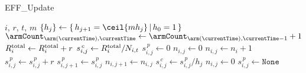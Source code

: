 \begin{algorithm}

\caption{{\small\sc EFF\_Update}}
\begin{algorithmic}[H]
\label{EFFUPDATE}
\REQUIRE $i$, $r$, $t$, $m$
\STATE $\left\{h_j\right\} \leftarrow  \left\{\, h_{j+1} = \ceil{mh_j}\, |\, h_0 =1 \,\right\}$
\STATE $\armCount_{\arm(\currentTime),\currentTime} \leftarrow \armCount_{\arm(\currentTime),\currentTime-1} +1$
\STATE $R^{\rm total}_i \leftarrow R^{\rm total}_i + r$ 
{\footnotesize {}}
\STATE $s_{i,j}^{\,c} \leftarrow R_i^{\rm total}/N_{i,t}$ 
{\footnotesize {}}
\STATE $s_{i,j}^{\,p} \leftarrow 0$
\STATE $n_{i,j}\leftarrow 0$
\ENDIF
{}
\STATE $n_{i,j} \leftarrow n_i +1$
\STATE $s_{i,j}^{\,p} \leftarrow s_{i,j}^{\,p} + r$
\STATE $s_{i,j+1}^{\,p} \leftarrow s_{i,j}^{\,p}$
\STATE $n_{i,j+1} \leftarrow n_{i,j}$
\ENDIF
\STATE $s_{i,j}^{\,c} \leftarrow s_{i,j}^{\,p}/h_j$
\STATE $n_{i,j} \leftarrow 0$
\STATE $s_{i,j}^{\,p} \leftarrow \texttt{None}$
\ENDIF
\ENDFOR
\end{algorithmic}
\end{algorithm}
\newpage
